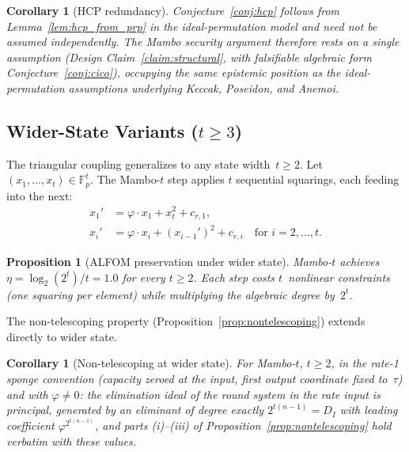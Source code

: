 \documentclass[11pt,a4paper]{article}
\newtheorem{corollary}[theorem]{Corollary}
\newtheorem{proposition}[theorem]{Proposition}
\theoremstyle{definition}
\newcommand{\Fp}{\mathbb{F}_p}
\begin{document}
\begin{corollary}[HCP redundancy]\label{cor:hcp_red}
Conjecture~\ref{conj:hcp} follows from
Lemma~\ref{lem:hcp_from_prp} in the ideal-permutation model and
need not be assumed independently.  The Mambo security argument
therefore rests on a single assumption
(Design Claim~\ref{claim:structural}, with falsifiable algebraic form
Conjecture~\ref{conj:cico}), occupying the same epistemic position
as the ideal-permutation assumptions underlying Keccak, Poseidon,
and Anemoi.
\end{corollary}




\subsection{Wider-State Variants ($t \ge 3$)}\label{sec:inst:wider}

The triangular coupling generalizes to any state width~$t \ge 2$.
Let $(x_1, \ldots, x_t) \in \Fp^t$. The Mambo-$t$ step applies
$t$ sequential squarings, each feeding into the next:
\begin{align*}
x_1' &= \varphi \cdot x_1 + x_t^2 + c_{r,1}, \\
x_i' &= \varphi \cdot x_i + (x_{i-1}')^2 + c_{r,i}
\quad \text{for } i = 2, \ldots, t.
\end{align*}

\begin{proposition}[ALFOM preservation under wider state]\label{prop:wider_alfom}
Mambo-$t$ achieves $\eta = \log_2(2^t)/t = 1.0$ for every $t \ge 2$.
Each step costs $t$~nonlinear constraints (one squaring per element)
while multiplying the algebraic degree by~$2^t$.
\end{proposition}

The non-telescoping property (Proposition~\ref{prop:nontelescoping})
extends directly to wider state.

\begin{corollary}[Non-telescoping at wider state]\label{cor:nontelescoping_wider}
For Mambo-$t$, $t \ge 2$, in the rate-1 sponge convention (capacity
zeroed at the input, first output coordinate fixed to~$\tau$) and with
$\varphi \ne 0$: the elimination ideal of the round system in the rate
input is principal, generated by an eliminant of degree exactly
$2^{t(n-1)} = D_I$ with leading coefficient $\varphi^{2^{t(n-1)}}$, and
parts (i)--(iii) of Proposition~\ref{prop:nontelescoping} hold verbatim
with these values.
\end{corollary}
\end{document}
